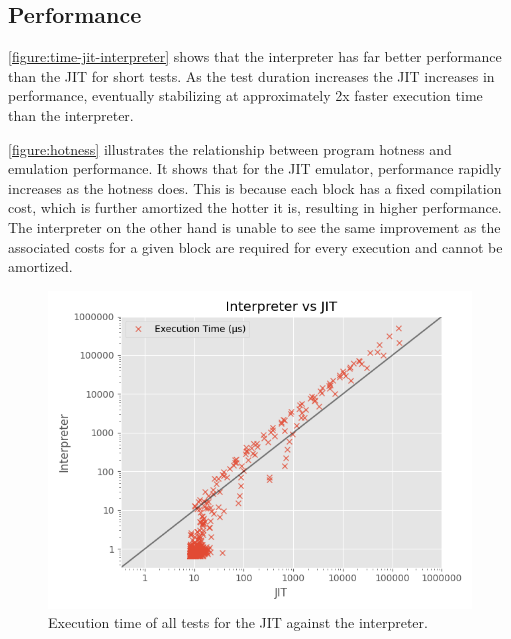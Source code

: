 \subsection{Performance}






\autoref{figure:time-jit-interpreter} shows that the interpreter has far better performance than the JIT for short tests. As the test duration increases the JIT increases in performance, eventually stabilizing at approximately 2x faster execution time than the interpreter.

\autoref{figure:hotness} illustrates the relationship between program hotness and emulation performance. It shows that for the JIT emulator, performance rapidly increases as the hotness does. This is because each block has a fixed compilation cost, which is further amortized the hotter it is, resulting in higher performance. The interpreter on the other hand is unable to see the same improvement as the associated costs for a given block are required for every execution and cannot be amortized.

\begin{figure}[H]
    \centering
    \includegraphics[scale=0.75]{output/graphs/scatter/vs/JIT-vs-Interpreter-time.png}
    \caption{Execution time of all tests for the JIT against the interpreter.}
    \label{figure:time-jit-interpreter}
\end{figure}


